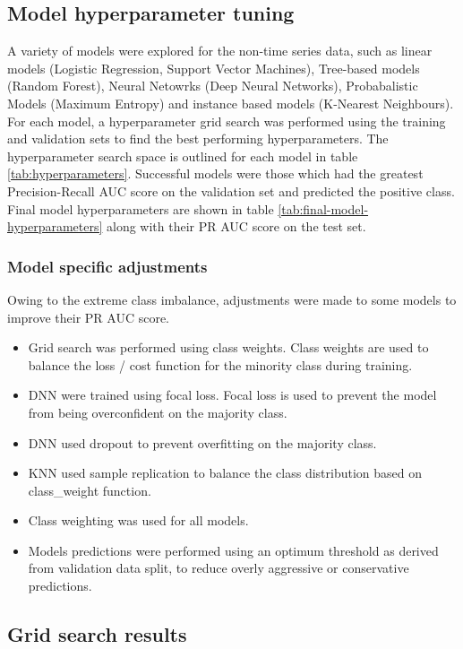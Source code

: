 \documentclass{article}
\begin{document}
\subsection{Model hyperparameter tuning}

A variety of models were explored for the non-time series data, such as linear models (Logistic Regression, Support Vector Machines), Tree-based models (Random Forest), Neural Netowrks (Deep Neural Networks), Probabalistic Models (Maximum Entropy) and instance based models (K-Nearest Neighbours).
For each model, a hyperparameter grid search was performed using the training and validation sets to find the best performing hyperparameters. The hyperparameter search space is outlined for each model in table \ref{tab:hyperparameters}. Successful models were those which had the greatest Precision-Recall AUC score on the validation set and predicted the positive class. Final model hyperparameters are shown in table \ref{tab:final-model-hyperparameters} along with their PR AUC score on the test set.

\subsubsection{Model specific adjustments}

Owing to the extreme class imbalance, adjustments were made to some models to improve their PR AUC score.
\begin{itemize}
    \item Grid search was performed using class weights. Class weights are used to balance the loss / cost function for the minority class during training.
    \item DNN were trained using focal loss. Focal loss is used to prevent the model from being overconfident on the majority class.
    \item DNN used dropout to prevent overfitting on the majority class.
    \item KNN used sample replication to balance the class distribution based on class\_weight function.
    \item Class weighting was used for all models.
    \item Models predictions were performed using an optimum threshold as derived from validation data split, to reduce overly aggressive or conservative predictions.
\end{itemize}

\subsection{Grid search results}
\end{document}
